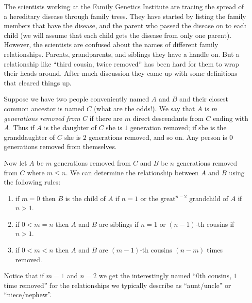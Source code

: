 
The scientists working at the Family Genetics Institute are tracing the spread of a hereditary disease through family trees.  They have started by listing the family members that have the disease, and the parent who passed the disease on to each child (we will assume that each child gets the disease from only one parent).  However, the scientists are confused about the names of different family relationships.  Parents, grandparents, and siblings they have a handle on.  But a relationship like ``third cousin, twice removed'' has been hard for them to wrap their heads around.   After much discussion they came up with some definitions that cleared things up.

Suppose we have two people conveniently named $A$ and $B$ and their closest common ancestor is named $C$ (what are the odds!).  We say that $A$ is {\em $m$ generations removed from $C$\/} if there are $m$ direct descendants from $C$ ending with $A$.  Thus if $A$ is the daughter of $C$ she is $1$ generation removed; if she is the granddaughter of $C$ she is $2$ generations removed, and so on.  Any person is $0$ generations removed from themselves.

Now let $A$ be $m$ generations removed from $C$ and $B$ be $n$ generations removed from $C$ where $m \leq n$.  We can determine the relationship between $A$ and $B$ using the following rules:
\begin{enumerate}
\item if $m = 0$ then $B$ is the child of $A$ if $n=1$ or the $\mbox{great}^{n-2}$ grandchild of $A$ if $n > 1$.
\item if $0 < m = n$ then $A$ and $B$ are siblings if $n=1$ or $(n-1)$-th cousins if $n > 1$.
\item if $0 < m < n$ then $A$ and $B$ are $(m-1)$-th cousins $(n-m)$ times removed.
\end{enumerate}
Notice that if $m = 1$ and $n = 2$ we get the interestingly named ``$0$th cousins, $1$ time removed'' for the relationships we typically describe as ``aunt/uncle'' or ``niece/nephew''.

